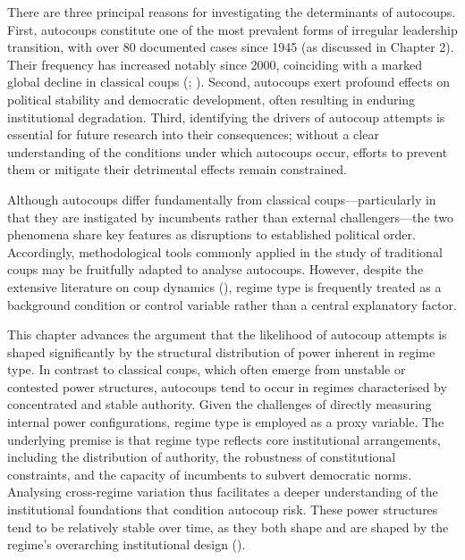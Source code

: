 \documentclass[
  12pt,
]{report}
\begin{document}
There are three principal reasons for investigating the determinants of
autocoups. First, autocoups constitute one of the most prevalent forms
of irregular leadership transition, with over 80 documented cases since
1945 (as discussed in Chapter 2). Their frequency has increased notably
since 2000, coinciding with a marked global decline in classical coups
(; ). Second, autocoups exert profound effects on political
stability and democratic development, often resulting in enduring
institutional degradation. Third, identifying the drivers of autocoup
attempts is essential for future research into their consequences;
without a clear understanding of the conditions under which autocoups
occur, efforts to prevent them or mitigate their detrimental effects
remain constrained.

Although autocoups differ fundamentally from classical
coups---particularly in that they are instigated by incumbents rather
than external challengers---the two phenomena share key features as
disruptions to established political order. Accordingly, methodological
tools commonly applied in the study of traditional coups may be
fruitfully adapted to analyse autocoups. However, despite the extensive
literature on coup dynamics (), regime type is frequently treated as a
background condition or control variable rather than a central
explanatory factor.

This chapter advances the argument that the likelihood of autocoup
attempts is shaped significantly by the structural distribution of power
inherent in regime type. In contrast to classical coups, which often
emerge from unstable or contested power structures, autocoups tend to
occur in regimes characterised by concentrated and stable authority.
Given the challenges of directly measuring internal power
configurations, regime type is employed as a proxy variable. The
underlying premise is that regime type reflects core institutional
arrangements, including the distribution of authority, the robustness of
constitutional constraints, and the capacity of incumbents to subvert
democratic norms. Analysing cross-regime variation thus facilitates a
deeper understanding of the institutional foundations that condition
autocoup risk. These power structures tend to be relatively stable over
time, as they both shape and are shaped by the regime's overarching
institutional design ().
\end{document}
